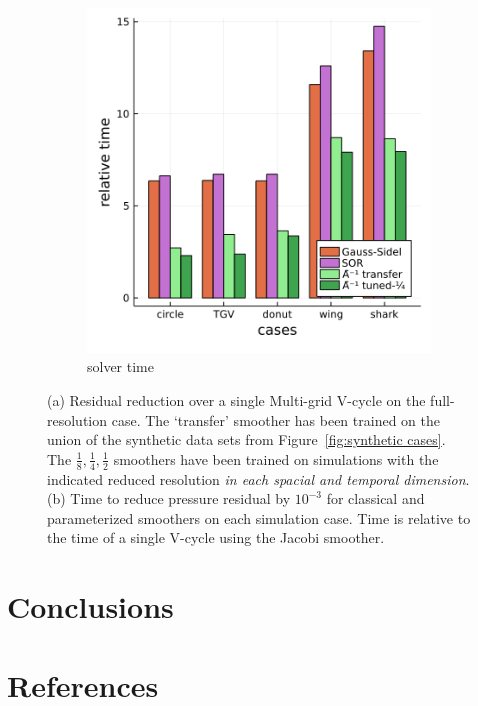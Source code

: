 \documentclass[review]{elsarticle}
\begin{document}
\begin{figure}
\begin{subfigure}[b]{0.47\textwidth}
        \includegraphics[width=\textwidth]{figures/crosscount.png}
        \caption{solver time}
        \label{fig:simulation time}
    \end{subfigure}
        \caption{(a) Residual reduction over a single Multi-grid V-cycle on the full-resolution case. The `transfer' smoother has been trained on the union of the synthetic data sets from Figure~\ref{fig:synthetic cases}. The $\frac 18, \frac 14, \frac 12$ smoothers have been trained on simulations with the indicated reduced resolution \textit{in each spacial and temporal dimension}. (b) Time to reduce pressure residual by $10^{-3}$ for classical and parameterized smoothers on each simulation case. Time is relative to the time of a single V-cycle using the Jacobi smoother.}
        \label{fig:tuned simulation}
\end{figure}


\section{Conclusions}

\section*{References}


\end{document}
